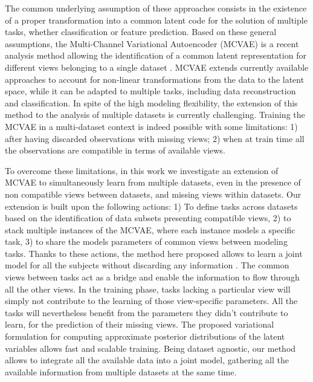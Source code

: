 The common underlying assumption of these approaches consists in the existence of a
proper transformation into a common latent code for the solution of multiple tasks,
whether classification or feature prediction.
%
Based on these general assumptions,
the Multi-Channel Variational Autoencoder (MCVAE) \citep{Antelmi2019}
is a recent  analysis method allowing the identification of a common latent representation for different views belonging to a single dataset .
MCVAE extends currently available approaches to account for non-linear transformations from the data to the latent space,
while it can be adapted to multiple tasks, including data reconstruction and classification.
In spite of the high modeling flexibility, the extension of this method to the analysis of multiple datasets is currently challenging.
Training the MCVAE in a multi-dataset context is indeed possible with some limitations:
1) after having discarded observations with missing views;
2) when at train time all the observations are compatible in terms of available views.

To overcome these limitations, in this work we investigate an extension of MCVAE to simultaneously learn from multiple datasets, even in the presence of non compatible views between datasets, and missing views within datasets.
Our extension is built upon the following actions:
1) To define tasks across datasets based on the identification of data subsets presenting compatible views,
2) to stack multiple instances of the MCVAE, where each instance models a specific task,
3) to share the models parameters of common views between modeling tasks.
%
Thanks to these actions, the method here proposed allows to learn a joint model for all the subjects without discarding any information .
The common views between tasks act as a bridge and enable the information to flow through all the other views.
In the training phase, tasks lacking a particular view will simply not contribute to the learning of those view-specific parameters.
All the tasks will nevertheless benefit from the parameters they didn't contribute to learn, for the prediction of their missing views.
The proposed variational formulation for computing approximate posterior distributions of the latent variables allows fast and scalable training.
Being dataset agnostic, our method allows to integrate all the available data into a joint model, gathering  all the available information from multiple datasets at the same time.

